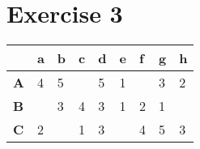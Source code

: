 \section{Exercise 3}

\begin{table}[!htb]
    \centering
    \begin{tabular}{lllllllllll}
    \hline
               & \textbf{a} & \textbf{b} & \textbf{c} & \textbf{d} & \multicolumn{2}{l}{\textbf{e}} & \textbf{f} & \multicolumn{2}{l}{\textbf{g}} & \textbf{h} \\ \hline
    \textbf{A} & 4          & 5          &            & 5          & \multicolumn{2}{l}{1}          &            & \multicolumn{2}{l}{3}          & 2          \\
    \textbf{B} &            & 3          & 4          & 3          & \multicolumn{2}{l}{1}          & 2          & \multicolumn{2}{l}{1}          &            \\
    \textbf{C} & 2          &            & 1          & 3          & \multicolumn{2}{l}{}           & 4          & \multicolumn{2}{l}{5}          & 3          \\ \hline
    \end{tabular}
\end{table}

